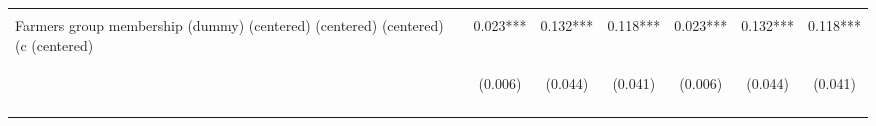 \begin{center}
\begin{tabular}{lcccccc}
\vspace{4pt} & \begin{footnotesize}[0.036]\end{footnotesize} & \begin{footnotesize}[0.000]\end{footnotesize} & \begin{footnotesize}[0.000]\end{footnotesize} & \begin{footnotesize}[0.036]\end{footnotesize} & \begin{footnotesize}[0.000]\end{footnotesize} & \begin{footnotesize}[0.000]\end{footnotesize} \\
Farmers group membership (dummy)  (centered) (centered) (centered) (c (centered) & 0.023*** & 0.132*** & 0.118*** & 0.023*** & 0.132*** & 0.118*** \\
 & \begin{footnotesize}(0.006)\end{footnotesize} & \begin{footnotesize}(0.044)\end{footnotesize} & \begin{footnotesize}(0.041)\end{footnotesize} & \begin{footnotesize}(0.006)\end{footnotesize} & \begin{footnotesize}(0.044)\end{footnotesize} & \begin{footnotesize}(0.041)\end{footnotesize} \\
\vspace{4pt} & \begin{footnotesize}[0.000]\end{footnotesize} & \begin{footnotesize}[0.003]\end{footnotesize} & \begin{footnotesize}[0.004]\end{footnotesize} & \begin{footnotesize}[0.000]\end{footnotesize} & \begin{footnotesize}[0.003]\end{footnotesize} & \begin{footnotesize}[0.004]\end{footnotesize} \\

\end{tabular}
\end{center}
